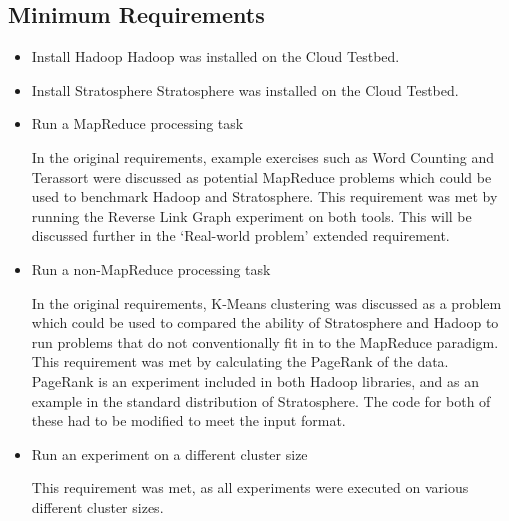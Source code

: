 \subsection{Minimum Requirements}
\begin{itemize}
	\item Install Hadoop
	Hadoop was installed on the Cloud Testbed.

	\item Install Stratosphere
	Stratosphere was installed on the Cloud Testbed.

	\item Run a MapReduce processing task

	In the original requirements, example exercises such as Word Counting and Terassort were discussed as potential MapReduce problems which could be used to benchmark Hadoop and Stratosphere. This requirement was met by running the Reverse Link Graph experiment on both tools. This will be discussed further in the `Real-world problem' extended requirement.

	\item Run a non-MapReduce processing task

	In the original requirements, K-Means clustering was discussed as a problem which could be used to compared the ability of Stratosphere and Hadoop to run problems that do not conventionally fit in to the MapReduce paradigm. This requirement was met by calculating the PageRank of the data. PageRank is an experiment included in both Hadoop libraries, and as an example in the standard distribution of Stratosphere. The code for both of these had to be modified to meet the input format.

	\item Run an experiment on a different cluster size

	This requirement was met, as all experiments were executed on various different cluster sizes.
\end{itemize}

